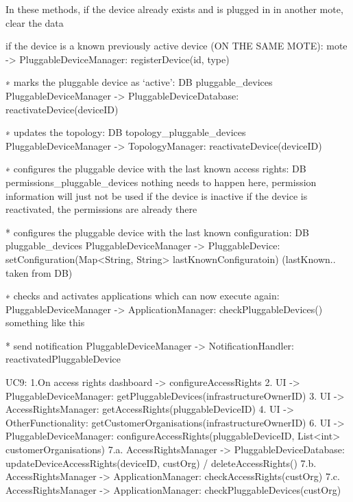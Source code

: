                 In these methods, if the device already exists and is plugged in in another mote, clear the data

            if the device is a known previously active device (ON THE SAME MOTE):
                mote -> PluggableDeviceManager: registerDevice(id, type)

                ∗ marks the pluggable device as ‘active’: DB pluggable_devices
                    PluggableDeviceManager -> PluggableDeviceDatabase: reactivateDevice(deviceID)

                ∗ updates the topology: DB topology_pluggable_devices
                    PluggableDeviceManager -> TopologyManager: reactivateDevice(deviceID)

                ∗ configures the pluggable device with the last known access rights: DB permissions_pluggable_devices
                    nothing needs to happen here, permission information will just not be used if the device is inactive
                                                  if the device is reactivated, the permissions are already there

                * configures the pluggable device with the last known configuration: DB pluggable_devices
                    PluggableDeviceManager -> PluggableDevice: setConfiguration(Map<String, String> lastKnownConfiguratoin) (lastKnown.. taken from DB)

                ∗ checks and activates applications which can now execute again:
                    PluggableDeviceManager -> ApplicationManager: checkPluggableDevices() something like this

                * send notification
                    PluggableDeviceManager -> NotificationHandler: reactivatedPluggableDevice

        UC9:
            1.On access rights dashboard -> configureAccessRights
                2. UI -> PluggableDeviceManager: getPluggableDevices(infrastructureOwnerID)
                3. UI -> AccessRightsManager: getAccessRights(pluggableDeviceID)
                4. UI -> OtherFunctionality: getCustomerOrganisations(infrastructureOwnerID)
            6. UI -> PluggableDeviceManager: configureAccessRights(pluggableDeviceID, List<int> customerOrganisations)
                7.a. AccessRightsManager -> PluggableDeviceDatabase: updateDeviceAccessRights(deviceID, custOrg) / deleteAccessRights()
            7.b. AccessRightsManager -> ApplicationManager: checkAccessRights(custOrg)
            7.c. AccessRightsManager -> ApplicationManager: checkPluggableDevices(custOrg)

